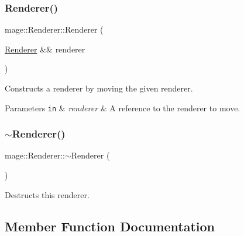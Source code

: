 \subsubsection{\texorpdfstring{Renderer()}{Renderer()}\hspace{0.1cm}{\footnotesize\ttfamily [3/3]}}
{\footnotesize\ttfamily mage\+::\+Renderer\+::\+Renderer (\begin{DoxyParamCaption}\item[{\hyperlink{classmage_1_1_renderer}{Renderer} \&\&}]{renderer }\end{DoxyParamCaption})\hspace{0.3cm}{\ttfamily [default]}}

Constructs a renderer by moving the given renderer.


\begin{DoxyParams}[1]{Parameters}
\mbox{\tt in}  & {\em renderer} & A reference to the renderer to move. \\
\hline
\end{DoxyParams}
\hypertarget{classmage_1_1_renderer_a997e041f28cc71d069d1ab7d29fe6ced}{}\label{classmage_1_1_renderer_a997e041f28cc71d069d1ab7d29fe6ced} 
\subsubsection{\texorpdfstring{$\sim$\+Renderer()}{~Renderer()}}
{\footnotesize\ttfamily mage\+::\+Renderer\+::$\sim$\+Renderer (\begin{DoxyParamCaption}{ }\end{DoxyParamCaption})\hspace{0.3cm}{\ttfamily [default]}}

Destructs this renderer. 

\subsection{Member Function Documentation}
\hypertarget{classmage_1_1_renderer_a7e303935e21196e28305cf4676128703}{}\label{classmage_1_1_renderer_a7e303935e21196e28305cf4676128703} 
